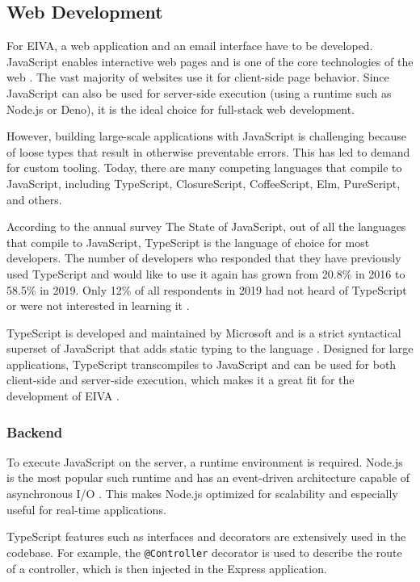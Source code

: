 \documentclass{article}
\begin{document}
\subsection{Web Development}

For EIVA, a web application and an email interface have to be developed. JavaScript enables interactive web pages and is one of the core technologies of the web \cite{flanagan_javascript:_2020}. The vast majority of websites use it for client-side page behavior. Since JavaScript can also be used for server-side execution (using a runtime such as Node.js or Deno), it is the ideal choice for full-stack web development.

However, building large-scale applications with JavaScript is challenging because of loose types that result in otherwise preventable errors. This has led to demand for custom tooling. Today, there are many competing languages that compile to JavaScript, including TypeScript, ClosureScript, CoffeeScript, Elm, PureScript, and others.

According to the annual survey The State of JavaScript, out of all the languages that compile to JavaScript, TypeScript is the language of choice for most developers. The number of developers who responded that they have previously used TypeScript and would like to use it again has grown from 20.8\% in 2016 to 58.5\% in 2019. Only 12\% of all respondents in 2019 had not heard of TypeScript or were not interested in learning it \cite{noauthor_state_nodate}.

TypeScript is developed and maintained by Microsoft and is a strict syntactical superset of JavaScript that adds static typing to the language \cite{hutchison_understanding_2014}. Designed for large applications, TypeScript transcompiles to JavaScript and can be used for both client-side and server-side execution, which makes it a great fit for the development of EIVA \cite{huisman_inference_2017}.

\subsubsection{Backend}

To execute JavaScript on the server, a runtime environment is required. Node.js is the most popular such runtime and has an event-driven architecture capable of asynchronous I/O \cite{kaimer_return_2018}. This makes Node.js optimized for scalability and especially useful for real-time applications.

TypeScript features such as interfaces and decorators are extensively used in the codebase. For example, the \texttt{@Controller} decorator is used to describe the route of a controller, which is then injected in the Express application.
\end{document}
